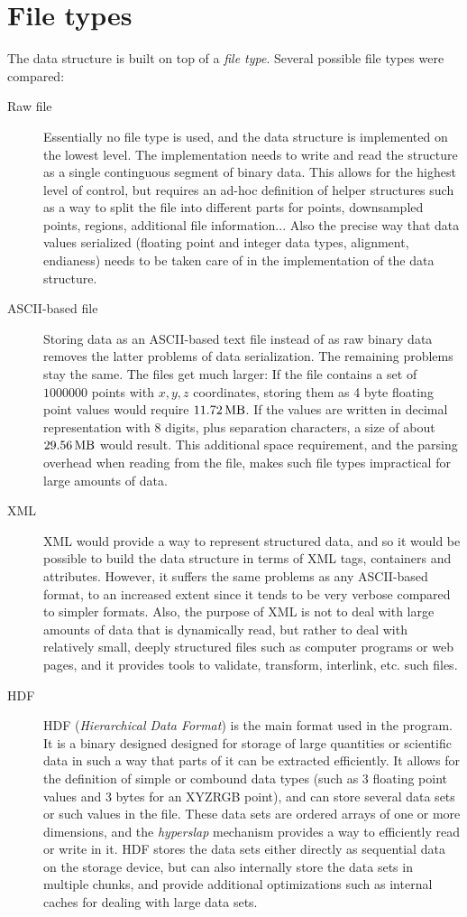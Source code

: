 \documentclass[a4paper,10pt,abstracton,notitlepage]{scrreprt}
\begin{document}
\section{File types}
The data structure is built on top of a \emph{file type}. Several possible file types were compared:
\begin{description}
\item[Raw file] Essentially no file type is used, and the data structure is implemented on the lowest level. The implementation needs to write and read the structure as a single continguous segment of binary data. This allows for the highest level of control, but requires an ad-hoc definition of helper structures such as a way to split the file into different parts for points, downsampled points, regions, additional file information... Also the precise way that data values serialized (floating point and integer data types, alignment, endianess) needs to be taken care of in the implementation of the data structure.
\item[ASCII-based file] Storing data as an ASCII-based text file instead of as raw binary data removes the latter problems of data serialization. The remaining problems stay the same. The files get much larger: If the file contains a set of $1000000$ points with $x, y, z$ coordinates, storing them as 4 byte floating point values would require $\SI{11. 72}{\mega\byte}$. If the values are written in decimal representation with 8 digits, plus separation characters, a size of about $\SI{29. 56}{\mega\byte}$ would result. This additional space requirement, and the parsing overhead when reading from the file, makes such file types impractical for large amounts of data.
\item[XML] XML would provide a way to represent structured data, and so it would be possible to build the data structure in terms of XML tags, containers and attributes. However, it suffers the same problems as any ASCII-based format, to an increased extent since it tends to be very verbose compared to simpler formats. Also, the purpose of XML is not to deal with large amounts of data that is dynamically read, but rather to deal with relatively small, deeply structured files such as computer programs or web pages, and it provides tools to validate, transform, interlink, etc. such files.
\item[HDF] HDF (\emph{Hierarchical Data Format}) is the main format used in the program. It is a binary designed designed for storage of large quantities or scientific data in such a way that parts of it can be extracted efficiently. It allows for the definition of simple or combound data types (such as 3 floating point values and 3 bytes for an XYZRGB point), and can store several data sets or such values in the file. These data sets are ordered arrays of one or more dimensions, and the \emph{hyperslap} mechanism provides a way to efficiently read or write in it. HDF stores the data sets either directly as sequential data on the storage device, but can also internally store the data sets in multiple chunks, and provide additional optimizations such as internal caches for dealing with large data sets.

\end{description}
\end{document}
